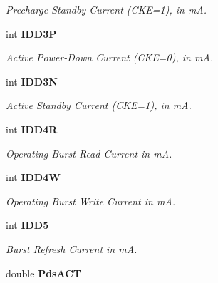 \begin{CompactItemize}
\begin{CompactList}\small\item\em Precharge Standby Current (CKE=1), in mA. \item\end{CompactList}\item 
int {\bf IDD3P}\label{class_d_r_a_m_sim_i_i_1_1power_config_35a88f76aaa58c8479d41f9f5a890a8b}

\begin{CompactList}\small\item\em Active Power-Down Current (CKE=0), in mA. \item\end{CompactList}\item 
int {\bf IDD3N}\label{class_d_r_a_m_sim_i_i_1_1power_config_5fbdde87ce233c502f09b646fe4dd877}

\begin{CompactList}\small\item\em Active Standby Current (CKE=1), in mA. \item\end{CompactList}\item 
int {\bf IDD4R}\label{class_d_r_a_m_sim_i_i_1_1power_config_541b87c794dabfd4ae37c32f4e2c6dcc}

\begin{CompactList}\small\item\em Operating Burst Read Current in mA. \item\end{CompactList}\item 
int {\bf IDD4W}\label{class_d_r_a_m_sim_i_i_1_1power_config_1bb2659718e5b241a085c1f5e8d4e1db}

\begin{CompactList}\small\item\em Operating Burst Write Current in mA. \item\end{CompactList}\item 
int {\bf IDD5}\label{class_d_r_a_m_sim_i_i_1_1power_config_9a622eb9fcdba3172a510687c09cba08}

\begin{CompactList}\small\item\em Burst Refresh Current in mA. \item\end{CompactList}\item 
double {\bf PdsACT}\label{class_d_r_a_m_sim_i_i_1_1power_config_d52824a6e3fc8750e42ef522a4be55b2}


\end{CompactItemize}
